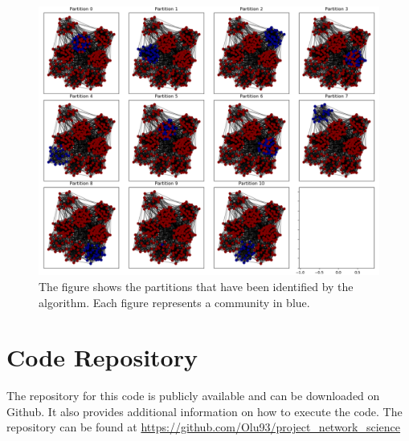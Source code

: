 \documentclass[11pt, twocolumn]{article}
\begin{document}
\begin{figure}[h]
  \includegraphics[width=\linewidth]{detected.png}
  \caption{The figure shows the partitions that have been identified by the algorithm. Each figure represents a community in blue.}
  \label{fig:detected}
\end{figure}



\section{Code Repository}
The repository for this code is publicly available and can be downloaded on Github. It also provides additional information on how to execute the code. The repository can be found at \url{https://github.com/Olu93/project_network_science}

\newpage
\printbibliography
\end{document}
